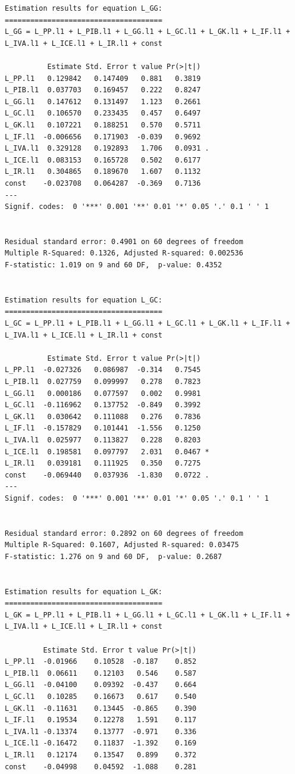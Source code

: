 \documentclass[
  spanish,
  letterpaper,
  DIV=11,
  numbers=noendperiod]{scrartcl}
\begin{document}
\begin{verbatim}
Estimation results for equation L_GG: 
===================================== 
L_GG = L_PP.l1 + L_PIB.l1 + L_GG.l1 + L_GC.l1 + L_GK.l1 + L_IF.l1 + L_IVA.l1 + L_ICE.l1 + L_IR.l1 + const 

          Estimate Std. Error t value Pr(>|t|)  
L_PP.l1   0.129842   0.147409   0.881   0.3819  
L_PIB.l1  0.037703   0.169457   0.222   0.8247  
L_GG.l1   0.147612   0.131497   1.123   0.2661  
L_GC.l1   0.106570   0.233435   0.457   0.6497  
L_GK.l1   0.107221   0.188251   0.570   0.5711  
L_IF.l1  -0.006656   0.171903  -0.039   0.9692  
L_IVA.l1  0.329128   0.192893   1.706   0.0931 .
L_ICE.l1  0.083153   0.165728   0.502   0.6177  
L_IR.l1   0.304865   0.189670   1.607   0.1132  
const    -0.023708   0.064287  -0.369   0.7136  
---
Signif. codes:  0 '***' 0.001 '**' 0.01 '*' 0.05 '.' 0.1 ' ' 1


Residual standard error: 0.4901 on 60 degrees of freedom
Multiple R-Squared: 0.1326, Adjusted R-squared: 0.002536 
F-statistic: 1.019 on 9 and 60 DF,  p-value: 0.4352 


Estimation results for equation L_GC: 
===================================== 
L_GC = L_PP.l1 + L_PIB.l1 + L_GG.l1 + L_GC.l1 + L_GK.l1 + L_IF.l1 + L_IVA.l1 + L_ICE.l1 + L_IR.l1 + const 

          Estimate Std. Error t value Pr(>|t|)  
L_PP.l1  -0.027326   0.086987  -0.314   0.7545  
L_PIB.l1  0.027759   0.099997   0.278   0.7823  
L_GG.l1   0.000186   0.077597   0.002   0.9981  
L_GC.l1  -0.116962   0.137752  -0.849   0.3992  
L_GK.l1   0.030642   0.111088   0.276   0.7836  
L_IF.l1  -0.157829   0.101441  -1.556   0.1250  
L_IVA.l1  0.025977   0.113827   0.228   0.8203  
L_ICE.l1  0.198581   0.097797   2.031   0.0467 *
L_IR.l1   0.039181   0.111925   0.350   0.7275  
const    -0.069440   0.037936  -1.830   0.0722 .
---
Signif. codes:  0 '***' 0.001 '**' 0.01 '*' 0.05 '.' 0.1 ' ' 1


Residual standard error: 0.2892 on 60 degrees of freedom
Multiple R-Squared: 0.1607, Adjusted R-squared: 0.03475 
F-statistic: 1.276 on 9 and 60 DF,  p-value: 0.2687 


Estimation results for equation L_GK: 
===================================== 
L_GK = L_PP.l1 + L_PIB.l1 + L_GG.l1 + L_GC.l1 + L_GK.l1 + L_IF.l1 + L_IVA.l1 + L_ICE.l1 + L_IR.l1 + const 

         Estimate Std. Error t value Pr(>|t|)
L_PP.l1  -0.01966    0.10528  -0.187    0.852
L_PIB.l1  0.06611    0.12103   0.546    0.587
L_GG.l1  -0.04100    0.09392  -0.437    0.664
L_GC.l1   0.10285    0.16673   0.617    0.540
L_GK.l1  -0.11631    0.13445  -0.865    0.390
L_IF.l1   0.19534    0.12278   1.591    0.117
L_IVA.l1 -0.13374    0.13777  -0.971    0.336
L_ICE.l1 -0.16472    0.11837  -1.392    0.169
L_IR.l1   0.12174    0.13547   0.899    0.372
const    -0.04998    0.04592  -1.088    0.281



\end{verbatim}
\end{document}
